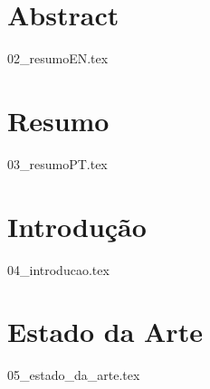\documentclass[
  oneside,
  11pt, a4paper,
  footinclude=true,
  headinclude=true,
  cleardoublepage=empty
]{scrbook}
\author{José Carlos Lima Martins}
\date{\myear} %
\begin{document}
    \umfrontcover{}
    \umtitlepage{}
	

	\chapter*{Abstract}
    {02_resumoEN.tex}
	
    \cleardoublepage{}
	\chapter*{Resumo}
    {03_resumoPT.tex}
	
	\tableofcontents
	\listoffigures
	\listoftables
	\lstlistoflistings
    \printglossary[]
    \printglossary[type=\acronymtype, title=Lista de Acrónimos]
	
	
    \chapter{Introdução}
    {04_introducao.tex}

	\chapter{Estado da Arte}
    {05_estado_da_arte.tex}


		
\end{document}
